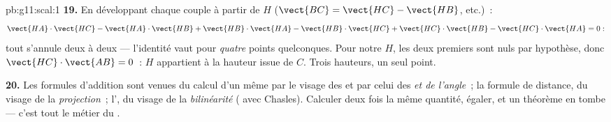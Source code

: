 \begin{solution}{pb:g11:scal:1}
\textbf{19.} En développant chaque couple à partir de $H$
($\vect{BC} = \vect{HC} - \vect{HB}$, etc.)~:
\[
\vect{HA} \cdot \vect{HC} - \vect{HA} \cdot \vect{HB}
+ \vect{HB} \cdot \vect{HA} - \vect{HB} \cdot \vect{HC}
+ \vect{HC} \cdot \vect{HB} - \vect{HC} \cdot \vect{HA} = 0 :
\]
tout s'annule deux à deux --- l'identité vaut pour \emph{quatre}
points quelconques. Pour notre $H$, les deux premiers  sont nuls par hypothèse, donc
$\vect{HC} \cdot \vect{AB} = 0$~: $H$ appartient à la hauteur issue
de $C$. Trois hauteurs, un seul point.

\textbf{20.} Les formules d'addition sont venues du calcul d'un même
 par le visage des \emph{} et par celui
des \emph{ et de l'angle}~; la formule de distance, du visage
de la \emph{projection}~; l', du visage de la
\emph{bilinéarité} ( avec Chasles). Calculer deux fois la
même quantité, égaler, et un théorème en tombe --- c'est tout le
métier du .
\end{solution}
